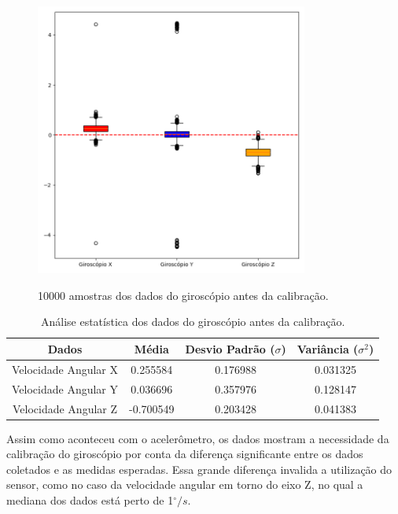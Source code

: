 \documentclass[acronym, symbols, table]{fei}
\begin{document}
	\begin{figure}[!htb]
		\centering
		\caption{10000 amostras dos dados do giroscópio antes da calibração.}
		\includegraphics[width=0.8\textwidth]{dados_giroscopio_errados.png}
		\label{fig:dados_giroscopio_errado}
	\end{figure}
	
	\begin{table}[!htb]
		\centering
		\caption{Análise estatística dos dados do giroscópio antes da calibração.}\label{tab:giroscopio_antes_calibracao}
		\begin{tabular}{|c|c|c|c|}
			\hline
			Dados & Média & Desvio Padrão ($\sigma$) & Variância ($\sigma^2$) \\ \hline
			\small Velocidade Angular X & 0.255584  & 0.176988 & 0.031325 \\ \hline
			\small Velocidade Angular Y & 0.036696  & 0.357976 & 0.128147 \\ \hline
			\small Velocidade Angular Z & -0.700549 & 0.203428 & 0.041383 \\ \hline	
		\end{tabular}
	\end{table}
	
	Assim como aconteceu com o acelerômetro, os dados mostram a necessidade da calibração do giroscópio por conta da diferença significante entre os dados coletados e as medidas esperadas. Essa grande diferença invalida a utilização do sensor, como no caso da velocidade angular em torno do eixo Z, no qual a mediana dos dados está perto de 1$^\circ/s$.
	
\end{document}
